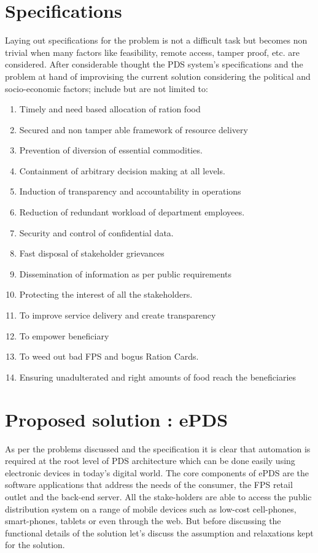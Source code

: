 \documentclass{article}
\begin{document}
\section{Specifications}

Laying out specifications for the problem is not a difficult task but becomes non trivial when many factors like feasibility, remote access, tamper proof, etc. are considered. After considerable thought the PDS system's specifications and the problem at hand of improvising the current solution considering the political and socio-economic factors; include but are not limited to:

\begin{enumerate}
\item Timely and need based allocation of ration food
\item Secured and non tamper able framework of resource delivery 
\item Prevention of diversion of essential commodities. 
\item Containment of arbitrary decision making at all levels. 
\item Induction of transparency and accountability in operations
\item Reduction of redundant workload of department employees. 
\item Security and control of confidential data. 
\item Fast disposal of stakeholder grievances
\item Dissemination of information as per public requirements
\item Protecting the interest of all the stakeholders. 
\item To improve service delivery and create transparency 
\item To empower beneficiary 
\item To weed out bad FPS and bogus Ration Cards. 
\item Ensuring unadulterated and right amounts of food reach the beneficiaries
\end{enumerate}

\section{Proposed solution : ePDS}

As per the problems discussed and the specification it is clear that automation is required at the root level of PDS architecture which can be done easily using electronic devices in today's digital world. The core components of ePDS are the software applications that address the needs of the consumer, the FPS retail outlet and the back-end server. All the stake-holders are able to access the public distribution system on a range of mobile devices such as low-cost cell-phones, smart-phones, tablets or even through the web. But before discussing the functional details of the solution let's discuss the assumption and relaxations kept for the solution.
\end{document}
